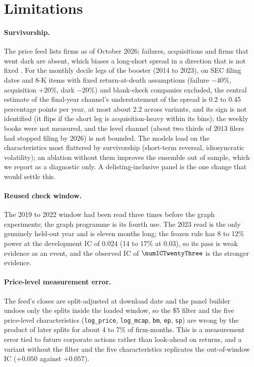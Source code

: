 \section{Limitations}\label{sec:limits}

\paragraph{Survivorship.}
The price feed lists firms as of October 2026; failures, acquisitions and firms that went dark are absent, which biases a long-short spread in a direction that is not fixed \citep{shumway1997}. For the monthly decile legs of the booster (2014 to 2023), on SEC filing dates and 8-K items with fixed return-at-death assumptions (failure $-40\%$, acquisition $+20\%$, dark $-20\%$) and blank-check companies excluded, the central estimate of the final-year channel's understatement of the spread is 0.2 to 0.45 percentage points per year, at most about 2.2 across variants, and its sign is not identified (it flips if the short leg is acquisition-heavy within its bins); the weekly books were not measured, and the level channel (about two thirds of 2013 filers had stopped filing by 2026) is not bounded. The models load on the characteristics most flattered by survivorship (short-term reversal, idiosyncratic volatility); an ablation without them improves the ensemble out of sample, which we report as a diagnostic only. A delisting-inclusive panel is the one change that would settle this.

\paragraph{Reused check window.}
The 2019 to 2022 window had been read three times before the graph experiments; the graph programme is its fourth use. The 2023 read is the only genuinely held-out year and is eleven months long; the frozen rule has 8 to 12\% power at the development IC of 0.024 (14 to 17\% at 0.03), so its pass is weak evidence as an event, and the observed IC of $\numICTwentyThree$ is the stronger evidence.

\paragraph{Price-level measurement error.}
The feed's closes are split-adjusted at download date and the panel builder undoes only the splits inside the loaded window, so the \$5 filter and the five price-level characteristics (\texttt{log\_price}, \texttt{log\_mcap}, \texttt{bm}, \texttt{ep}, \texttt{sp}) are wrong by the product of later splits for about 4 to 7\% of firm-months. This is a measurement error tied to future corporate actions rather than look-ahead on returns, and a variant without the filter and the five characteristics replicates the out-of-window IC ($+0.050$ against $+0.057$).

